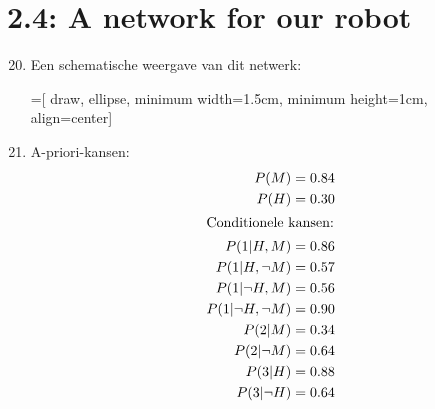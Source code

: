 \documentclass[a4paper,10pt,fleqn]{article}
\begin{document}
\section*{2.4: A network for our robot}
\begin{enumerate}[1.]
    \setcounter{enumi}{19}
    \item Een schematische weergave van dit netwerk:

    =[
            draw, ellipse, minimum width=1.5cm, minimum height=1cm, align=center]
    \begin{center}
    \end{center}

    \item
        A-priori-kansen:
        \begin{align*}
            P(M)                    & = 0.84 \\
            P(H)                    & = 0.30 \\
        \intertext{Conditionele kansen:}
            P(1 | H, M)             & = 0.86 \\
            P(1 | H, \neg M)        & = 0.57 \\
            P(1 | \neg H, M)        & = 0.56 \\
            P(1 | \neg H, \neg M)   & = 0.90 \\
            P(2 | M)                & = 0.34 \\
            P(2 | \neg M)           & = 0.64 \\
            P(3 | H)                & = 0.88 \\
            P(3 | \neg H)           & = 0.64 \\
        \end{align*}



\end{enumerate}
\end{document}
